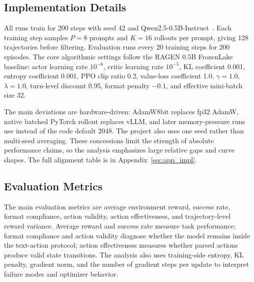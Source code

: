 \subsection{Implementation Details}

All runs train for 200 steps with seed 42 and Qwen2.5-0.5B-Instruct~\citep{yang2024qwen25}. Each training step samples \(P=8\) prompts and \(K=16\) rollouts per prompt, giving 128 trajectories before filtering. Evaluation runs every 20 training steps for 200 episodes. The core algorithmic settings follow the RAGEN 0.5B FrozenLake baseline: actor learning rate \(10^{-6}\), critic learning rate \(10^{-5}\), KL coefficient 0.001, entropy coefficient 0.001, PPO clip ratio 0.2, value-loss coefficient 1.0, \(\gamma=1.0\), \(\lambda=1.0\), turn-level discount 0.95, format penalty \(-0.1\), and effective mini-batch size 32.

The main deviations are hardware-driven: AdamW8bit replaces fp32 AdamW, native batched PyTorch rollout replaces vLLM, and later memory-pressure runs use  instead of the code default 2048. The project also uses one seed rather than multi-seed averaging. These concessions limit the strength of absolute performance claims, so the analysis emphasizes large relative gaps and curve shapes. The full alignment table is in Appendix~\ref{sec:app_impl}.

\subsection{Evaluation Metrics}

The main evaluation metrics are average environment reward, success rate, format compliance, action validity, action effectiveness, and trajectory-level reward variance. Average reward and success rate measure task performance; format compliance and action validity diagnose whether the model remains inside the text-action protocol; action effectiveness measures whether parsed actions produce valid state transitions. The analysis also uses training-side entropy, KL penalty, gradient norm, and the number of gradient steps per update to interpret failure modes and optimizer behavior.
